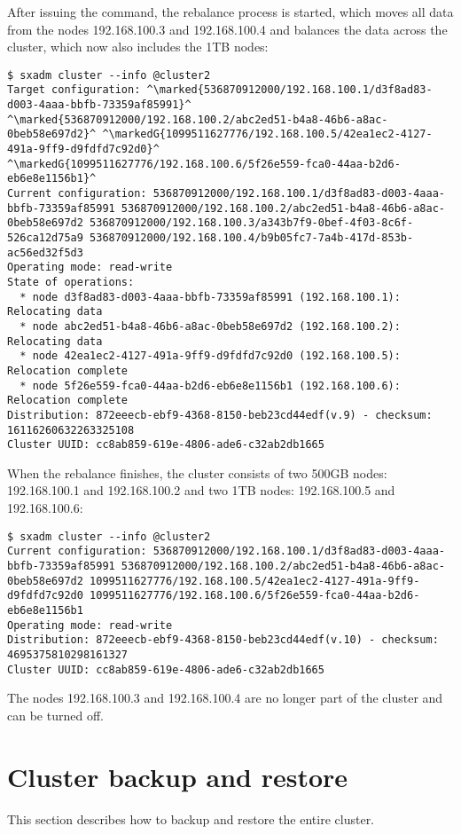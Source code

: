 After issuing the command, the rebalance process is started, which moves all
data from the nodes 192.168.100.3 and 192.168.100.4 and balances the data across
the cluster, which now also includes the 1TB nodes:
\begin{lstlisting}
$ sxadm cluster --info @cluster2
Target configuration: ^\marked{536870912000/192.168.100.1/d3f8ad83-d003-4aaa-bbfb-73359af85991}^ ^\marked{536870912000/192.168.100.2/abc2ed51-b4a8-46b6-a8ac-0beb58e697d2}^ ^\markedG{1099511627776/192.168.100.5/42ea1ec2-4127-491a-9ff9-d9fdfd7c92d0}^ ^\markedG{1099511627776/192.168.100.6/5f26e559-fca0-44aa-b2d6-eb6e8e1156b1}^
Current configuration: 536870912000/192.168.100.1/d3f8ad83-d003-4aaa-bbfb-73359af85991 536870912000/192.168.100.2/abc2ed51-b4a8-46b6-a8ac-0beb58e697d2 536870912000/192.168.100.3/a343b7f9-0bef-4f03-8c6f-526ca12d75a9 536870912000/192.168.100.4/b9b05fc7-7a4b-417d-853b-ac56ed32f5d3
Operating mode: read-write
State of operations:
  * node d3f8ad83-d003-4aaa-bbfb-73359af85991 (192.168.100.1): Relocating data
  * node abc2ed51-b4a8-46b6-a8ac-0beb58e697d2 (192.168.100.2): Relocating data
  * node 42ea1ec2-4127-491a-9ff9-d9fdfd7c92d0 (192.168.100.5): Relocation complete
  * node 5f26e559-fca0-44aa-b2d6-eb6e8e1156b1 (192.168.100.6): Relocation complete
Distribution: 872eeecb-ebf9-4368-8150-beb23cd44edf(v.9) - checksum: 16116260632263325108
Cluster UUID: cc8ab859-619e-4806-ade6-c32ab2db1665
\end{lstlisting}
When the rebalance finishes, the cluster consists of two 500GB nodes:
192.168.100.1 and 192.168.100.2 and two 1TB nodes: 192.168.100.5 and
192.168.100.6:
\begin{lstlisting}
$ sxadm cluster --info @cluster2
Current configuration: 536870912000/192.168.100.1/d3f8ad83-d003-4aaa-bbfb-73359af85991 536870912000/192.168.100.2/abc2ed51-b4a8-46b6-a8ac-0beb58e697d2 1099511627776/192.168.100.5/42ea1ec2-4127-491a-9ff9-d9fdfd7c92d0 1099511627776/192.168.100.6/5f26e559-fca0-44aa-b2d6-eb6e8e1156b1
Operating mode: read-write
Distribution: 872eeecb-ebf9-4368-8150-beb23cd44edf(v.10) - checksum: 4695375810298161327
Cluster UUID: cc8ab859-619e-4806-ade6-c32ab2db1665
\end{lstlisting}
The nodes 192.168.100.3 and 192.168.100.4 are no longer part of the cluster
and can be turned off.

\section{Cluster backup and restore}
This section describes how to backup and restore the entire cluster.

